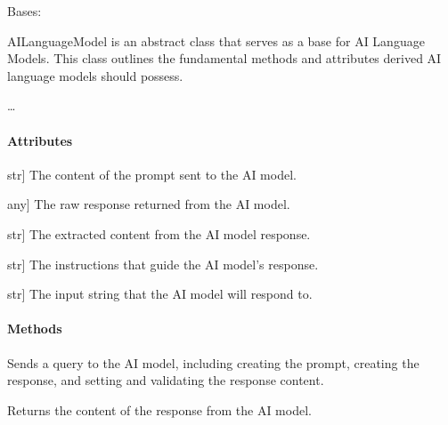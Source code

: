 \documentclass[letterpaper,10pt,english]{sphinxmanual}
\begin{document}
\begin{fulllineitems}
\label{\detokenize{main.ai_language_model:main.ai_language_model.ai_language_model.AILanguageModel}}
\pysigstartsignatures
{}
\pysigstopsignatures
\sphinxAtStartPar
Bases: 

\sphinxAtStartPar
AILanguageModel is an abstract class that serves as a base for AI Language Models.
This class outlines the fundamental methods and attributes derived AI language models should possess.

\sphinxAtStartPar
…


\paragraph{Attributes}
\label{\detokenize{main.ai_language_model:attributes}}\begin{description}
\sphinxlineitem{prompt\_content}{[}str{]}
\sphinxAtStartPar
The content of the prompt sent to the AI model.

\sphinxlineitem{\_response}{[}any{]}
\sphinxAtStartPar
The raw response returned from the AI model.

\sphinxlineitem{response\_content}{[}str{]}
\sphinxAtStartPar
The extracted content from the AI model response.

\sphinxlineitem{prompt\_instruction}{[}str{]}
\sphinxAtStartPar
The instructions that guide the AI model’s response.

\sphinxlineitem{prompt\_input\_str}{[}str{]}
\sphinxAtStartPar
The input string that the AI model will respond to.

\end{description}


\paragraph{Methods}
\label{\detokenize{main.ai_language_model:methods}}\begin{description}
\sphinxAtStartPar
Sends a query to the AI model, including creating the prompt, creating the response,
and setting and validating the response content.

\sphinxAtStartPar
Returns the content of the response from the AI model.


\end{description}
\end{fulllineitems}
\end{document}
